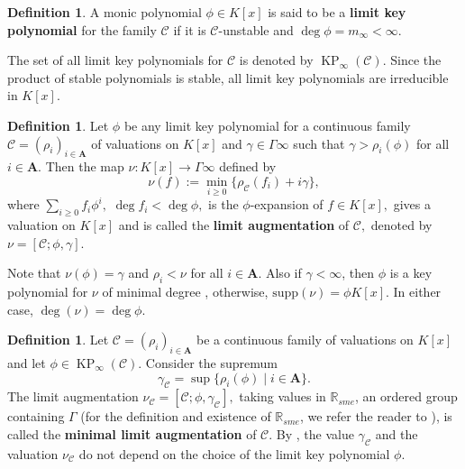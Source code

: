 \documentclass[11pt]{amsart}
\newtheorem{lemma}[theorem]{Lemma}
\theoremstyle{definition}
\newtheorem{definition}[theorem]{Definition}
\theoremstyle{remark}
\numberwithin{equation}{section}
\begin{document}
\begin{definition}
	A monic polynomial $\phi\in K[x]$ is said to be a {\bf limit key polynomial} for the family $\mathcal{C}$ if it is $\mathcal{C}$-unstable and $\deg\phi=m_{\infty}<\infty.$
\end{definition}

The set of all limit key polynomials for $\mathcal{C}$ is denoted by $\operatorname{KP}_{\infty}(\mathcal{C}).$  Since the product of stable polynomials is stable, all limit key polynomials are irreducible in $K[x].$ 


%
%
%
\begin{definition}
	Let   $\phi$ be any limit key polynomial for a continuous family $\mathcal{C}=(\rho_i)_{i\in\mathbf{A}}$ of valuations on $K[x]$ and  $\gamma\in \Gamma\infty$ such that $\gamma>\rho_i(\phi)$ for all $i\in\mathbf{A}.$ Then the map $\nu: K[x]\longrightarrow\Gamma\infty$ defined by
	$$\nu(f):=\min_{i\geq 0}\{\rho_\mathcal{C}(f_i)+i\gamma\},$$
	where  $\sum_{i\geq 0} f_i\phi^i,$ $\deg f_i<\deg \phi,$ is the $\phi$-expansion of $f\in K[x],$ gives a valuation on $K[x]$ and is called  the {\bf limit augmentation} of $\mathcal{C},$  denoted by $\nu=[\mathcal{C}; \phi, \gamma].$ 
\end{definition}
  Note that $\nu(\phi)=\gamma$ and $\rho_i<\nu$ for all $i\in\mathbf{A}.$ Also if $\gamma<\infty$, then $\phi$ is a key polynomial for $\nu$ of minimal degree  \cite[Proposition 3.5]{EN1}, otherwise, $\text{supp}(\nu)=\phi K[x].$ In either case, $\deg (\nu)=\deg\phi.$

\begin{definition}
	Let $\mathcal{C}=(\rho_i)_{i\in\mathbf{A}}$ be a continuous family of valuations on $K[x]$ and let $\phi\in\operatorname{KP}_{\infty}(\mathcal{C})$. Consider the supremum \[\gamma_{\mathcal{C}}=\sup\{\rho_i({\phi})\mid i\in\mathbf{A}\}.\]
			The limit augmentation $\nu_{\mathcal{C}}=[\mathcal{C};\phi,\gamma_{\mathcal{C}}],$ taking values in $\mathbb{R}_{sme}$, an ordered group containing $\Gamma$ (for the definition and existence of $\mathbb{R}_{sme}$, we refer the reader to \cite[Section 5.3]{EN3}), is called the {\bf minimal limit augmentation} of $\mathcal{C}$. By \cite[Lemma 4.7]{Ma2}, the value $\gamma_{\mathcal{C}}$ and the valuation $\nu_{\mathcal{C}}$ do not depend on the choice of the limit key polynomial  $\phi.$ 
\end{definition}
\end{document}
